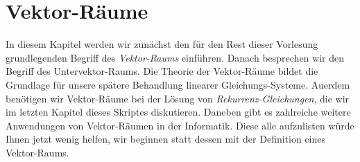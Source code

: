 \chapter{Vektor-R\"{a}ume}
In diesem Kapitel werden wir zun\"{a}chst den f\"{u}r den Rest dieser Vorlesung grundlegenden Begriff des \emph{Vektor-Raums}
einf\"{u}hren.  Danach besprechen wir den Begriff des Untervektor-Raums. 
Die Theorie der Vektor-R\"{a}ume bildet die Grundlage f\"{u}r unsere sp\"{a}tere Behandlung linearer Gleichungs-Systeme.
Au\3erdem ben\"{o}tigen wir Vektor-R\"{a}ume bei der L\"{o}sung von \emph{Rekurrenz-Gleichungen}, die wir im letzten
Kapitel dieses Skriptes diskutieren.  Daneben gibt es zahlreiche weitere Anwendungen von Vektor-R\"{a}umen in der
Informatik.  Diese alle aufzulisten w\"{u}rde Ihnen jetzt wenig helfen, wir beginnen statt dessen mit
der Definition eines Vektor-Raums. 

\renewcommand{\labelenumi}{\arabic{enumi}.}
\renewcommand{\labelenumii}{(\alph{enumii})}


